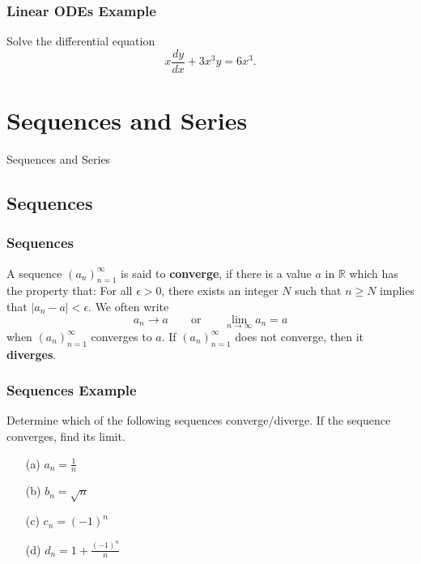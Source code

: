 \documentclass{beamer}
\begin{document}
\begin{frame}[t]
\frametitle{Linear ODEs Example}
\small
\begin{Example}
Solve the differential equation 
$$
x\frac{dy}{dx} + 3x^3y = 6 x^3.
$$
\end{Example}
\end{frame}


\section{Sequences and Series}

\begin{frame}
\begin{center}
\Huge Sequences and Series
\end{center}
\end{frame}

\subsection{Sequences}

\begin{frame}
\frametitle{Sequences}
\begin{Definition}
A sequence $\displaystyle(a_n)_{n = 1}^\infty$ is said to {\bf converge}, if there is a value $a$ in $\mathbb{R}$ which has the property that: For all $\epsilon > 0$, there exists an integer $N$ such that $n\geq N$ implies that $|a_n - a| < \epsilon$.  We often write
$$
a_n\to a\qquad\text{or}\qquad\lim_{n\to\infty} a_n = a
$$
when $\displaystyle(a_n)_{n = 1}^\infty$ converges to $a$. If $\displaystyle(a_n)_{n = 1}^\infty$ does not converge, then it {\bf diverges}. 
\end{Definition}
\end{frame}

\begin{frame}[t]
\frametitle{Sequences Example}
\begin{Example}
Determine which of the following sequences converge/diverge. If the sequence converges, find its limit.
\begin{enumerate}
\item[(a)] $\displaystyle a_n = \frac{1}{n}$
\item[(b)] $\displaystyle b_n = \sqrt{n}$
\item[(c)]  $\displaystyle c_n = (-1)^n$
\item[(d)] $\displaystyle d_n = 1 + \frac{(-1)^n}{n}$
\end{enumerate} 
\end{Example}
\end{frame}
\end{document}
